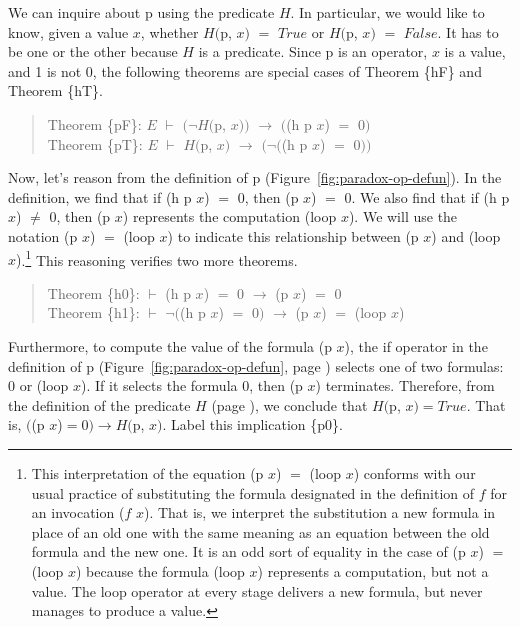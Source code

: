 We can inquire about \textsf{p} using the predicate $H$.
In particular, we would like to know, given a value $x$,
whether $H($\textsf{p}, $x)$ $=$ $True$ or $H($\textsf{p}, $x)$ $=$ $False$.
It has to be one or the other because $H$ is a predicate.
Since \textsf{p} is an operator, $x$ is a value, and \textsf{1} is not \textsf{0},
the following theorems are special cases of
Theorem \{hF\} and Theorem \{hT\}.
\begin{quote}
Theorem \{pF\}: $E$ $\vdash$ $(\neg H($\textsf{p}, $x))$ $\rightarrow$ $($\textsf{(h p $x$)} $=$ \textsf{0}$)$ \\
Theorem \{pT\}: $E$ $\vdash$ $H($\textsf{p}, $x)$ $\rightarrow$ $(\neg($\textsf{(h p $x$)} $=$ \textsf{0}$))$
\end{quote}

Now, let's reason from the definition of
\textsf{p} (Figure~\ref{fig:paradox-op-defun}).
In the definition, we find that if \textsf{(h p $x$)} $=$ \textsf{0},
then \textsf{(p $x$)} $=$ \textsf{0}.
We also find that if \textsf{(h p $x$)} $\neq$ \textsf{0},
then \textsf{(p $x$)} represents
the computation \textsf{(loop $x$)}.
We will use the notation \textsf{(p $x$)} $=$ \textsf{(loop $x$)}
to indicate this relationship between \textsf{(p $x$)} and \textsf{(loop $x$)}.\footnote{This
\label{caveat:equality-for-loop}
interpretation of the equation \textsf{(p $x$)} $=$ \textsf{(loop $x$)} conforms with
our usual practice of substituting the formula designated in the
definition of $f$ for an invocation \textsf{($f$ $x$)}.
That is, we interpret the substitution a new formula
in place of an old one with the same meaning as an equation
between the old formula and the new one.
It is an odd sort of equality in the case of \textsf{(p $x$)} $=$ \textsf{(loop $x$)}
because the formula \textsf{(loop $x$)} represents a computation,
but not a value.
The \textsf{loop} operator at every stage delivers a new formula,
but never manages to produce a value.}
This reasoning verifies two more theorems.
\begin{quote}
Theorem \{h0\}: $\vdash$  \textsf{(h p $x$)} $=$ \textsf{0}  $\rightarrow$ \textsf{(p $x$)} $=$ \textsf{0}    \\
Theorem \{h1\}: $\vdash$  $\neg($\textsf{(h p $x$)} $=$ \textsf{0}$)$ $\rightarrow$ \textsf{(p $x$)} $=$ \textsf{(loop $x$)}
\end{quote}

Furthermore, to compute the value of the formula \textsf{(p $x$)},
the \textsf{if} operator in the definition of \textsf{p}
(Figure~\ref{fig:paradox-op-defun}, page \pageref{fig:paradox-op-defun})
selects one of two formulas:
\textsf{0} or \textsf{(loop $x$)}. 
If it selects the formula \textsf{0}, then (p $x$) terminates. 
Therefore, from the definition of the predicate $H$ (page \pageref{def:predicate-H}),
we conclude that $H($p, $x)=True$. 
That is, $($\textsf{(p $x$)}$=$\textsf{0}$)\rightarrow H($\textsf{p}, $x)$.
Label this implication \{p0\}.

